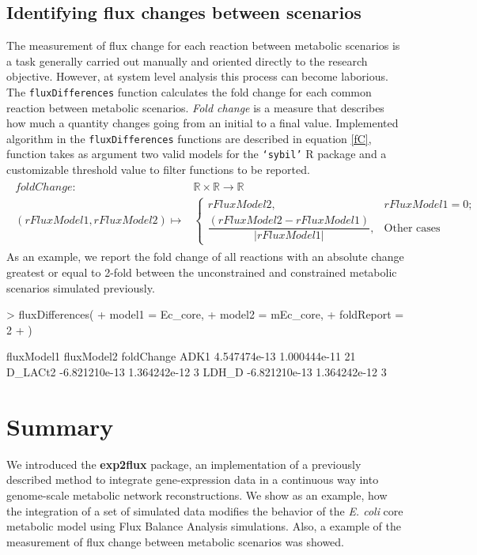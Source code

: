 \subsection*{Identifying flux changes between scenarios}
The measurement of flux change for each reaction between metabolic scenarios is a task generally carried out manually and oriented directly to the research objective. However, at system level analysis this process can become laborious. The \texttt{fluxDifferences} function calculates the fold change for each common reaction between metabolic scenarios. \emph{Fold change} is a measure that describes how much a quantity changes going from an initial to a final value. Implemented algorithm in the \texttt{fluxDifferences} functions are described in equation \ref{fC}, function takes as argument two valid models for the \texttt{`sybil'} R package and a customizable threshold value to filter functions to be reported.
\begin{align}
\label{fC}
\begin{split}
foldChange:&  \mathbb{R} \times \mathbb{R} \rightarrow \mathbb{R} \\
(rFluxModel1, rFluxModel2) \mapsto & \begin{cases}
rFluxModel2, & rFluxModel1 = 0; \\
\dfrac{(rFluxModel2 - rFluxModel1)}{\vert rFluxModel1\vert},  & \text{Other cases}
\end{cases}
\end{split}
\end{align}
As an example, we report the fold change of all reactions with an absolute change greatest or equal to 2-fold between the unconstrained and constrained metabolic scenarios simulated previously.
\begin{Schunk}
\begin{Sinput}
> fluxDifferences(
+   model1 = Ec_core,
+   model2 = mEc_core,
+   foldReport = 2
+   )
\end{Sinput}
\begin{Soutput}
           fluxModel1   fluxModel2 foldChange
ADK1     4.547474e-13 1.000444e-11         21
D_LACt2 -6.821210e-13 1.364242e-12          3
LDH_D   -6.821210e-13 1.364242e-12          3
\end{Soutput}
\end{Schunk}
\section{Summary}
We introduced the \textbf{exp2flux} package, an implementation of a previously described method to integrate gene-expression data in a continuous way into genome-scale metabolic network reconstructions. We show as an example, how the integration of a set of simulated data modifies the behavior of the \textit{E. coli} core metabolic model using Flux Balance Analysis simulations. Also, a example of the measurement of flux change between metabolic scenarios was showed.